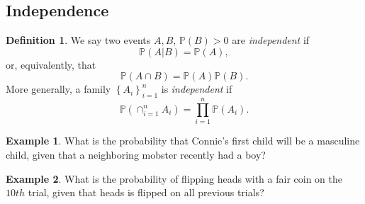 \documentclass[12pt]{article}
\newcommand{\prob}{\mathbb{P}}
\theoremstyle{plain}
\theoremstyle{definition}
\newtheorem*{definition}{Definition}
\newtheorem*{example}{Example}
\theoremstyle{remark}
\numberwithin{equation}{section}  %
\begin{document}
\subsection{Independence}
\begin{definition}
We say two events $A, B$, $\prob(B) > 0$ are \emph{independent} if \[\prob(A |
B) = \prob(A),\] or, equivalently, that \[\prob(A \cap B) = \prob(A) \prob(B).\] More generally,
a family $ \left\{ A_i \right\}_{i = 1}^n $ is
\emph{independent} if 
\[ \prob(\cap_{i = 1}^n A_i) = \prod_{i = 1}^n \prob(A_i).\]
\end{definition}
\begin{example}
What is the probability that Connie's first child will be a masculine child,
given that a neighboring mobster recently had a boy?
\end{example}
\begin{example}
What is the probability of flipping heads with a fair coin on the $10th$ trial,
given that heads is flipped on all previous trials?
\end{example}
\end{document}
